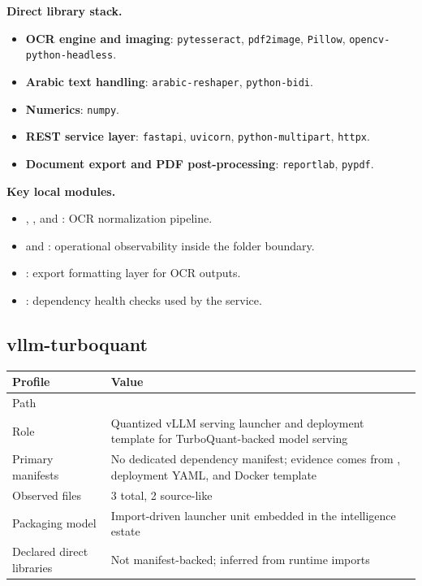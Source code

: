 \documentclass[11pt,a4paper]{article}
\begin{document}
\textbf{Direct library stack.}
\begin{itemize}[leftmargin=*]
    \item \textbf{OCR engine and imaging}: \texttt{pytesseract}, \texttt{pdf2image}, \texttt{Pillow}, \texttt{opencv-python-headless}.
    \item \textbf{Arabic text handling}: \texttt{arabic-reshaper}, \texttt{python-bidi}.
    \item \textbf{Numerics}: \texttt{numpy}.
    \item \textbf{REST service layer}: \texttt{fastapi}, \texttt{uvicorn}, \texttt{python-multipart}, \texttt{httpx}.
    \item \textbf{Document export and PDF post-processing}: \texttt{reportlab}, \texttt{pypdf}.
\end{itemize}

\textbf{Key local modules.}
\begin{itemize}[leftmargin=*]
    \item {}, , and : OCR normalization pipeline.
    \item {} and : operational observability inside the folder boundary.
    \item {}: export formatting layer for OCR outputs.
    \item {}: dependency health checks used by the service.
\end{itemize}

\subsection{vllm-turboquant}

\begin{tabular}{@{}P{4.2cm}P{9.8cm}@{}}
\toprule
\textbf{Profile} & \textbf{Value} \\
\midrule
Path &  \\
Role & Quantized vLLM serving launcher and deployment template for TurboQuant-backed model serving \\
Primary manifests & No dedicated dependency manifest; evidence comes from , deployment YAML, and Docker template \\
Observed files & 3 total, 2 source-like \\
Packaging model & Import-driven launcher unit embedded in the intelligence estate \\
Declared direct libraries & Not manifest-backed; inferred from runtime imports \\
\bottomrule
\end{tabular}
\end{document}
